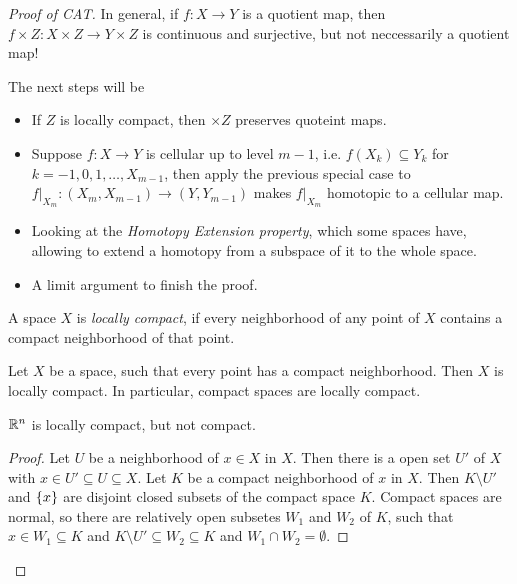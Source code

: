 \documentclass{TemplateLecture}
\begin{document}
\begin{proof}[Proof of CAT]
    In general, if \(f\colon X\to Y\) is a quotient map, then \(f\times Z\colon X\times Z \to Y\times Z\) is continuous and surjective, but not neccessarily a quotient map!

    The next steps will be
    \begin{itemize}
        \item If \(Z\) is locally compact, then \(\times Z\) preserves quoteint maps.
        \item Suppose \(f\colon X\to Y\) is cellular up to level \(m-1\), i.e. \(f(X_k) \subseteq Y_k\) for \(k = -1, 0, 1, \dots, X_{m-1}\), then apply the previous special case to \(f\rvert_{X_m} \colon (X_m, X_{m-1}) \to (Y, Y_{m-1})\) makes \(f\rvert_{X_m}\) homotopic to a cellular map.
        \item Looking at the \emph{Homotopy Extension property}, which some spaces have, allowing to extend a homotopy from a subspace of it to the whole space.
        \item A limit argument to finish the proof.
    \end{itemize} 

    \begin{defi}{}{}
        A space \(X\) is \emph{locally compact}, if every neighborhood of any point of \(X\) contains a compact neighborhood of that point.
    \end{defi}
    \begin{lem}{}{}
        Let \(X\) be a space, such that every point has a compact neighborhood. Then \(X\) is locally compact. In particular, compact spaces are locally compact.
    \end{lem}
    \begin{example}
        \(\mathbb{R}^n\) is locally compact, but not compact.
    \end{example}
    \begin{proof}
        Let \(U\) be a neighborhood of \(x \in X\) in \(X\). Then there is a open set \(U'\) of \(X\) with \(x \in U' \subseteq U \subseteq X\). Let \(K\) be a compact neighborhood of \(x\) in \(X\). Then \(K\setminus U'\) and \(\{x\}\) are disjoint closed subsets of the compact space \(K\). Compact spaces are normal, so there are relatively open subsetes \(W_1\) and \(W_2\) of \(K\), such that \(x \in W_1 \subseteq K\) and \(K\setminus U' \subseteq W_2 \subseteq K\) and \(W_1 \cap W_2 = \emptyset\).
        

\end{proof}
\end{proof}
\end{document}

